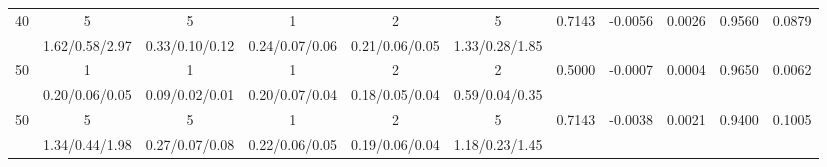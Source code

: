 \documentclass[twoside]{article}
\begin{document}
\begin{table}[htbp]
{\begin{tabular}{c c c c c c c c c c c}
				40 & 5 & 5 & 1 & 2 & 5 & 0.7143 & -0.0056 & 0.0026 & 0.9560 & 0.0879 \\
				& 1.62/0.58/2.97 & 0.33/0.10/0.12 & 0.24/0.07/0.06 & 0.21/0.06/0.05 & 1.33/0.28/1.85 & & & & & \\
				\hline
				
				50 & 1 & 1 & 1 & 2 & 2 & 0.5000 & -0.0007 & 0.0004 & 0.9650 & 0.0062 \\
				& 0.20/0.06/0.05 & 0.09/0.02/0.01 & 0.20/0.07/0.04 & 0.18/0.05/0.04 & 0.59/0.04/0.35 & & & & & \\
				\hline
				
				50 & 5 & 5 & 1 & 2 & 5 & 0.7143 & -0.0038 & 0.0021 & 0.9400 & 0.1005 \\
				& 1.34/0.44/1.98 & 0.27/0.07/0.08 & 0.22/0.06/0.05 & 0.19/0.06/0.04 & 1.18/0.23/1.45 & & & & & \\
				\hline
				
			\end{tabular}%
		}
\end{table}
\end{document}
